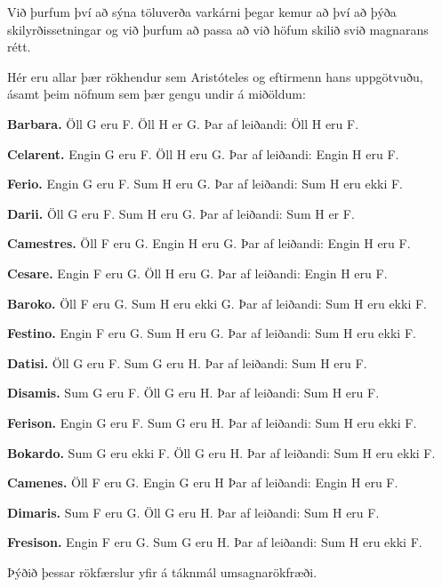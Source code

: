Við þurfum því að sýna töluverða varkárni þegar kemur að því að þýða skilyrðissetningar og við þurfum að passa að við höfum skilið svið magnarans rétt.

\practiceproblems
\problempart
\label{pr.BarbaraEtc}
Hér eru allar þær rökhendur sem Aristóteles og eftirmenn hans uppgötvuðu, ásamt þeim nöfnum sem þær gengu undir á miðöldum:
\begin{ebullet}
	\item \textbf{Barbara.} Öll G eru F. Öll H er G. Þar af leiðandi:  Öll H eru F.
	\item \textbf{Celarent.} Engin G eru F. Öll H eru G. Þar af leiðandi: Engin H eru F.
	\item \textbf{Ferio.} Engin G eru F. Sum H eru G. Þar af leiðandi: Sum H eru ekki F.
	\item \textbf{Darii.} Öll G eru F. Sum H eru G. Þar af leiðandi: Sum H er F.
	\item \textbf{Camestres.} Öll F eru G. Engin H eru G. Þar af leiðandi: Engin H eru F.
	\item \textbf{Cesare.} Engin F eru G. Öll H eru G. Þar af leiðandi: Engin H eru F.
	\item \textbf{Baroko.} Öll F eru G. Sum H eru ekki G. Þar af leiðandi: Sum H eru ekki F.
	\item \textbf{Festino.} Engin F eru G. Sum H eru G. Þar af leiðandi: Sum H eru ekki F.
	\item \textbf{Datisi.} Öll G eru F. Sum G eru H. Þar af leiðandi: Sum H eru F.
	\item \textbf{Disamis.} Sum G eru F. Öll G eru H. Þar af leiðandi: Sum H eru F.
	\item \textbf{Ferison.} Engin G eru F. Sum G eru H. Þar af leiðandi: Sum H eru ekki F.
	\item \textbf{Bokardo.} Sum G eru ekki F. Öll G eru H. Þar af leiðandi:  Sum H eru ekki F.
	\item \textbf{Camenes.} Öll F eru G. Engin G eru H Þar af leiðandi: Engin H eru F.
	\item \textbf{Dimaris.} Sum F eru G. Öll G eru H. Þar af leiðandi: Sum H eru F.
	\item \textbf{Fresison.} Engin F eru G. Sum G eru H. Þar af leiðandi: Sum H eru ekki F.
\end{ebullet}
Þýðið þessar rökfærslur yfir á táknmál umsagnarökfræði.
\\

